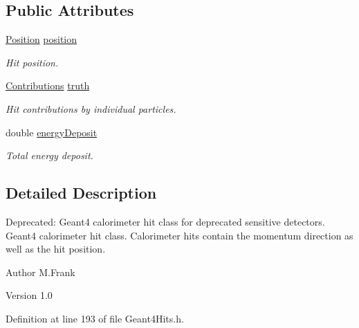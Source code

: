 \subsection*{Public Attributes}
\begin{DoxyCompactItemize}
\item 
\hyperlink{namespace_d_d4hep_1_1_simulation_ad6fd94b3439e31d1ba4b2e640d578558}{Position} \hyperlink{class_d_d4hep_1_1_simulation_1_1_geant4_calorimeter_hit_a1e8c2c552a126d33cca2fbf15354309f}{position}
\begin{DoxyCompactList}\small\item\em Hit position. \item\end{DoxyCompactList}\item 
\hyperlink{class_d_d4hep_1_1_simulation_1_1_geant4_hit_acdc278ce7e641d337b024d5fc8f52a2c}{Contributions} \hyperlink{class_d_d4hep_1_1_simulation_1_1_geant4_calorimeter_hit_a2db0ef9e8d6cfd29213269ccc8d53256}{truth}
\begin{DoxyCompactList}\small\item\em Hit contributions by individual particles. \item\end{DoxyCompactList}\item 
double \hyperlink{class_d_d4hep_1_1_simulation_1_1_geant4_calorimeter_hit_ae597e191f120cea7585fec73ddae48e9}{energyDeposit}
\begin{DoxyCompactList}\small\item\em Total energy deposit. \item\end{DoxyCompactList}\end{DoxyCompactItemize}


\subsection{Detailed Description}
Deprecated: Geant4 calorimeter hit class for deprecated sensitive detectors. Geant4 calorimeter hit class. Calorimeter hits contain the momentum direction as well as the hit position.

\begin{DoxyAuthor}{Author}
M.Frank 
\end{DoxyAuthor}
\begin{DoxyVersion}{Version}
1.0 
\end{DoxyVersion}


Definition at line 193 of file Geant4Hits.h.

